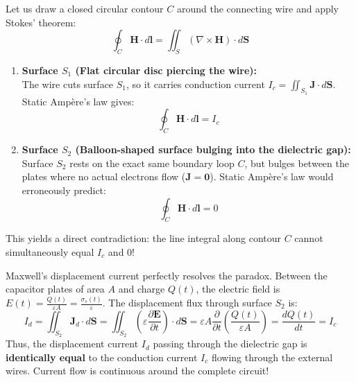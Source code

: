 Let us draw a closed circular contour $C$ around the connecting wire and apply Stokes' theorem:
\begin{equation}
    \oint_C \mathbf{H} \cdot d\mathbf{l} = \iint_S (\nabla \times \mathbf{H}) \cdot d\mathbf{S}
\end{equation}
\begin{enumerate}
    \item \textbf{Surface $S_1$ (Flat circular disc piercing the wire):}\\
    The wire cuts surface $S_1$, so it carries conduction current $I_c = \iint_{S_1} \mathbf{J} \cdot d\mathbf{S}$. Static Ampère's law gives:
    \begin{equation}
        \oint_C \mathbf{H} \cdot d\mathbf{l} = I_c
    \end{equation}
    \item \textbf{Surface $S_2$ (Balloon-shaped surface bulging into the dielectric gap):}\\
    Surface $S_2$ rests on the exact same boundary loop $C$, but bulges between the plates where no actual electrons flow ($\mathbf{J} = \mathbf{0}$). Static Ampère's law would erroneously predict:
    \begin{equation}
        \oint_C \mathbf{H} \cdot d\mathbf{l} = 0
    \end{equation}
\end{enumerate}
This yields a direct contradiction: the line integral along contour $C$ cannot simultaneously equal $I_c$ and $0$!

Maxwell's displacement current perfectly resolves the paradox. Between the capacitor plates of area $A$ and charge $Q(t)$, the electric field is $E(t) = \frac{Q(t)}{\varepsilon A} = \frac{\sigma_s(t)}{\varepsilon}$. The displacement flux through surface $S_2$ is:
\begin{equation}
    I_d = \iint_{S_2} \mathbf{J}_d \cdot d\mathbf{S} = \iint_{S_2} \left(\varepsilon \frac{\partial \mathbf{E}}{\partial t}\right) \cdot d\mathbf{S} = \varepsilon A \frac{\partial}{\partial t}\left(\frac{Q(t)}{\varepsilon A}\right) = \frac{dQ(t)}{dt} = I_c
\end{equation}
Thus, the displacement current $I_d$ passing through the dielectric gap is \textbf{identically equal} to the conduction current $I_c$ flowing through the external wires. Current flow is continuous around the complete circuit!

